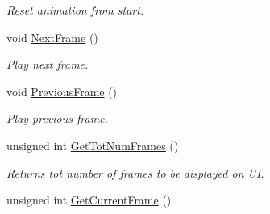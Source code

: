 \begin{DoxyCompactItemize}
\begin{DoxyCompactList}\small\item\em Reset animation from start. \end{DoxyCompactList}\item 
void \hyperlink{class_n_g_l_scene_abc67a3094c0031132cd56f9b80f46fa9}{Next\+Frame} ()\hypertarget{class_n_g_l_scene_abc67a3094c0031132cd56f9b80f46fa9}{}\label{class_n_g_l_scene_abc67a3094c0031132cd56f9b80f46fa9}

\begin{DoxyCompactList}\small\item\em Play next frame. \end{DoxyCompactList}\item 
void \hyperlink{class_n_g_l_scene_a373a926122512f573a8e26417e017942}{Previous\+Frame} ()\hypertarget{class_n_g_l_scene_a373a926122512f573a8e26417e017942}{}\label{class_n_g_l_scene_a373a926122512f573a8e26417e017942}

\begin{DoxyCompactList}\small\item\em Play previous frame. \end{DoxyCompactList}\item 
unsigned int \hyperlink{class_n_g_l_scene_aa3a2319e793171d905eae8396c15971f}{Get\+Tot\+Num\+Frames} ()\hypertarget{class_n_g_l_scene_aa3a2319e793171d905eae8396c15971f}{}\label{class_n_g_l_scene_aa3a2319e793171d905eae8396c15971f}

\begin{DoxyCompactList}\small\item\em Returns tot number of frames to be displayed on UI. \end{DoxyCompactList}\item 
unsigned int \hyperlink{class_n_g_l_scene_ad358a828f3f9567180120672b9aac3f4}{Get\+Current\+Frame} ()\hypertarget{class_n_g_l_scene_ad358a828f3f9567180120672b9aac3f4}{}\label{class_n_g_l_scene_ad358a828f3f9567180120672b9aac3f4}


\end{DoxyCompactItemize}
